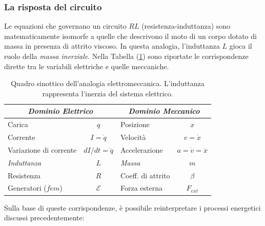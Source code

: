 \documentclass[a4paper,11pt]{report}
\begin{document}
\subsubsection{La risposta del circuito}
Le equazioni che governano un circuito $RL$ (resistenza-induttanza) sono matematicamente isomorfe a quelle che descrivono il moto di un corpo dotato di massa in presenza di attrito viscoso. In questa analogia, l'induttanza $L$ gioca il ruolo della \textit{massa inerziale}. Nella Tabella (\ref{tab:analogia_elettro_mecc}) sono riportate le corrispondenze dirette tra le variabili elettriche e quelle meccaniche.
\begin{table}[htbp]
    \centering
    \renewcommand{\arraystretch}{1.5}
    \begin{tabular}{l c | l c}
        \hline
        \multicolumn{2}{c|}{\textit{Dominio Elettrico}} & \multicolumn{2}{c}{\textit{Dominio Meccanico}} \\
        \hline
        Carica & $q$ & Posizione & $x$ \\
        Corrente & $I = \dot{q}$ & Velocità & $v = \dot{x}$ \\
        Variazione di corrente & $dI/dt = \ddot{q}$ & Accelerazione & $a = \dot{v} = \ddot{x}$ \\
        \hline
        \textit{Induttanza} & $L$ & \textit{Massa} & $m$ \\
        Resistenza & $R$ & Coeff. di attrito & $\beta$ \\
        Generatori ($fem$) & $\mathcal{E}$ & Forza esterna & $F_{ext}$ \\
        \hline
    \end{tabular}
    \caption{Quadro sinottico dell'analogia elettromeccanica. L'induttanza rappresenta l'inerzia del sistema elettrico.}
    \label{tab:analogia_elettro_mecc}
\end{table}
Sulla base di queste corrispondenze, è possibile reinterpretare i processi energetici discussi precedentemente:
\end{document}
